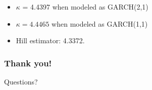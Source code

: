 \documentclass{beamer}
\begin{document}
\begin{frame}
   \begin{itemize}
   \item $\kappa$ = 4.4397 when modeled as GARCH(2,1)
   \item $\kappa=4.4465$ when modeled as GARCH(1,1)
   \item Hill estimator: 4.3372.
   \end{itemize}
 \end{frame}

 \begin{frame}
   \frametitle{Thank you!}
   Questions?
 \end{frame}


\end{document}
